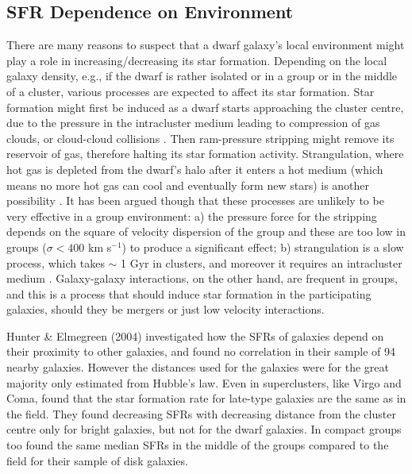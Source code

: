 \documentclass[preprint]{aastex}
\begin{document}
\subsection{SFR Dependence on Environment}

There are many reasons to suspect that a dwarf galaxy's local 
environment might play a role in increasing/decreasing its 
star formation. Depending on the local galaxy density, e.g., if the
dwarf is rather isolated or in a group or in the middle of a cluster,
various processes are expected to affect its star formation. 
Star formation might first be induced as a dwarf starts approaching
the cluster centre, due to the pressure in the intracluster medium 
leading to compression of gas clouds, or cloud-cloud collisions
\citep{e97}. Then ram-pressure stripping might remove its
reservoir of gas, therefore halting its star formation activity.
Strangulation, where hot gas is depleted from the dwarf's halo after
it enters a hot medium (which means no more hot gas can cool and
eventually form new stars) is another possibility \citep{ltc80}.
It has been argued though that these processes are unlikely
to be very effective in a group environment: a) the pressure force
for the stripping depends on the square of velocity dispersion of the group
and these are too low in groups ($\sigma < 400$ km s$^{-1}$) to produce a 
significant effect; b) strangulation is a slow process, which takes $\sim$ 1
Gyr in clusters, and moreover it requires an intracluster medium 
\citep{c06}. Galaxy-galaxy interactions, on the other hand, are
frequent in groups, and this is a process that should induce star 
formation in the participating galaxies, should they be mergers
or just low velocity interactions.

Hunter \& Elmegreen (2004) investigated how the SFRs of galaxies depend on 
their proximity to other galaxies, and found no correlation 
in their sample of 94 nearby galaxies.
However the distances used for the galaxies were for the great majority only 
estimated from Hubble's law. 
Even in superclusters, like Virgo and Coma, \citet{g98, g02}
found that the star formation rate for late-type galaxies are the same 
as in the field. They found decreasing SFRs with
decreasing distance from the cluster centre only for bright galaxies,
but not for the dwarf galaxies. In compact groups too \citet{iv99} 
found the same median SFRs in the middle of the
groups compared to the field for their sample of disk galaxies.
\end{document}

